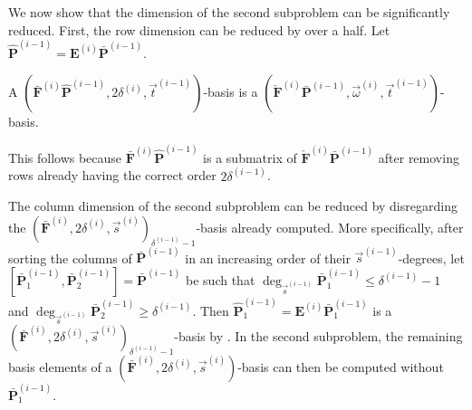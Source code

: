 We now show that the dimension of the second subproblem can be significantly
reduced. First, the row dimension can be reduced by over a half. Let
$\hat{\mathbf{P}}^{\left(i-1\right)}=\mathbf{E}^{\left(i\right)}\bar{\mathbf{P}}^{\left(i-1\right)}$. 
\begin{lem}
\label{lem:simplifySecondSubproblem}A $(\bar{\mathbf{F}}^{\left(i\right)}\hat{\mathbf{P}}^{\left(i-1\right)},2\delta^{\left(i\right)},\vec{t}^{\left(i-1\right)})$-basis
is a $(\check{\mathbf{F}}^{\left(i\right)}\bar{\mathbf{P}}^{\left(i-1\right)},\vec{\omega}^{\left(i\right)},\vec{t}^{\left(i-1\right)})$-basis.\end{lem}
\begin{pf}
This follows because $\bar{\mathbf{F}}^{\left(i\right)}\hat{\mathbf{P}}^{\left(i-1\right)}$
is a submatrix of $\check{\mathbf{F}}^{\left(i\right)}\bar{\mathbf{P}}^{\left(i-1\right)}$
after removing rows already having the correct order $2\delta^{\left(i-1\right)}$. 
\end{pf}
The column dimension of the second subproblem can be reduced by disregarding
the $(\bar{\mathbf{F}}^{\left(i\right)},2\delta^{\left(i\right)},\vec{s}^{\left(i\right)})_{\delta^{\left(i-1\right)}-1}$-basis
already computed. More specifically, after sorting the columns of
$\bar{\mathbf{P}}^{\left(i-1\right)}$ in an increasing order of their
$\vec{s}^{\left(i-1\right)}$-degrees, let $[\bar{\mathbf{P}}_{1}^{\left(i-1\right)},\bar{\mathbf{P}}_{2}^{\left(i-1\right)}]=\bar{\mathbf{P}}^{\left(i-1\right)}$
be such that $\deg_{\vec{s}^{\left(i-1\right)}}\bar{\mathbf{P}}_{1}^{\left(i-1\right)}\le\delta^{\left(i-1\right)}-1$
and $\deg_{\vec{s}^{\left(i-1\right)}}\bar{\mathbf{P}}_{2}^{\left(i-1\right)}\ge\delta^{\left(i-1\right)}$.
Then $\hat{\mathbf{P}}_{1}^{\left(i-1\right)}=\mathbf{E}^{\left(i\right)}\bar{\mathbf{P}}_{1}^{\left(i-1\right)}$
is a $(\bar{\mathbf{F}}^{\left(i\right)},2\delta^{\left(i\right)},\vec{s}^{\left(i\right)})_{\delta^{\left(i-1\right)}-1}$-basis
by . In the second subproblem,
the remaining basis elements of a $(\bar{\mathbf{F}}^{\left(i\right)},2\delta^{\left(i\right)},\vec{s}^{\left(i\right)})$-basis
can then be computed without $\bar{\mathbf{P}}_{1}^{\left(i-1\right)}$.

